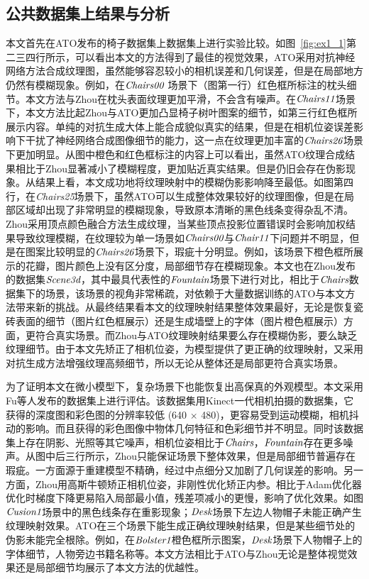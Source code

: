 \subsection{公共数据集上结果与分析}
本文首先在ATO发布的椅子数据集上数据集上进行实验比较。如图~\ref{fig:ex1_1}第二三四行所示，可以看出本文的方法得到了最佳的视觉效果，ATO采用对抗神经网络方法合成纹理图，虽然能够容忍较小的相机误差和几何误差，但是在局部地方仍然有模糊现象。例如，在$\emph{Chairs00}$ 场景下（图第一行）红色框所标注的枕头细节。本文方法与Zhou在枕头表面纹理更加平滑，不会含有噪声。在$\emph{Chairs11}$场景下，本文方法比起Zhou与ATO更加凸显椅子树叶图案的细节，如第三行红色框所展示内容。单纯的对抗生成大体上能合成貌似真实的结果，但是在相机位姿误差影响下干扰了神经网络合成图像细节的能力，这一点在纹理更加丰富的$\emph{Chairs26}$场景下更加明显。从图中橙色和红色框标注的内容上可以看出，虽然ATO纹理合成结果相比于Zhou显著减小了模糊程度，更加贴近真实结果。但是仍旧会存在伪影现象。从结果上看，本文成功地将纹理映射中的模糊伪影影响降至最低。如图第四行，在\emph{Chairs25}场景下，虽然ATO可以生成整体效果较好的纹理图像，但是在局部区域却出现了非常明显的模糊现象，导致原本清晰的黑色线条变得杂乱不清。Zhou采用顶点颜色融合方法生成纹理，当某些顶点投影位置错误时会影响加权结果导致纹理模糊，在纹理较为单一场景如$\emph{Chairs00}$与$\emph{Chair11}$下问题并不明显，但是在图案比较明显的$\emph{Chairs26}$场景下，瑕疵十分明显。例如，该场景下橙色框所展示的花瓣，图片颜色上没有区分度，局部细节存在模糊现象。本文也在Zhou发布的数据集$\emph{Scene3d}$，其中最具代表性的$\emph{Fountain}$场景下进行对比，相比于$\emph{Chairs}$数据集下的场景，该场景的视角非常稀疏，对依赖于大量数据训练的ATO与本文方法带来新的挑战。从最终结果看本文的纹理映射结果整体效果最好，无论是恢复瓷砖表面的细节（图片红色框展示）还是生成墙壁上的字体（图片橙色框展示）方面，更符合真实场景。而Zhou与ATO纹理映射结果要么存在模糊伪影，要么缺乏纹理细节。由于本文先矫正了相机位姿，为模型提供了更正确的纹理映射，又采用对抗生成方法增强纹理高频细节，所以无论从整体还是局部更符合真实场景。\par

为了证明本文在微小模型下，复杂场景下也能恢复出高保真的外观模型。本文采用Fu等人发布的数据集上进行评估。该数据集用Kinect一代相机拍摄的数据集，它获得的深度图和彩色图的分辨率较低 (640 $\times$ 480)，更容易受到运动模糊，相机抖动的影响。而且获得的彩色图像中物体几何特征和色彩细节并不明显。同时该数据集上存在阴影、光照等其它噪声，相机位姿相比于$\emph{Chairs}$，$\emph{Fountain}$存在更多噪声。从图中后三行所示，Zhou只能保证场景下整体效果，但是局部细节普遍存在瑕疵。一方面源于重建模型不精确，经过中点细分又加剧了几何误差的影响。另一方面，Zhou用高斯牛顿矫正相机位姿，非刚性优化矫正内参。相比于Adam优化器优化时梯度下降更易陷入局部最小值，残差项减小的更慢，影响了优化效果。如图$\emph{Cusion1}$场景中的黑色线条存在重影现象；$\emph{Desk}$场景下左边人物帽子未能正确产生纹理映射效果。ATO在三个场景下能生成正确纹理映射结果，但是某些细节处的伪影未能完全根除。例如，在$\emph{Bolster1}$橙色框所示图案，$\emph{Desk}$场景下人物帽子上的字体细节，人物旁边书籍名称等。本文方法相比于ATO与Zhou无论是整体视觉效果还是局部细节均展示了本文方法的优越性。\par

